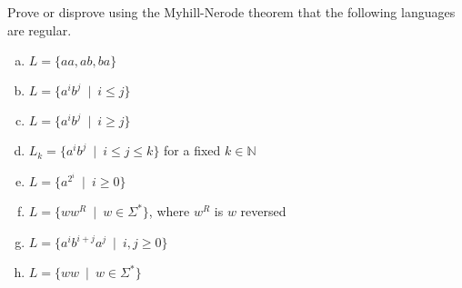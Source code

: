\documentclass[a4paper,12pt]{amsart}
\begin{document}
\medskip\begin{problem}

    Prove or disprove using the Myhill-Nerode theorem that the following languages are regular.
    \begin{enumerate}[(a)]\setlength\itemsep{12pt}
        \item $L=\{aa, ab, ba\}$
        \item $L=\{a^ib^j\ \mid\ i\leq j\}$
        \item $L=\{a^ib^j\ \mid\ i\geq j\}$
        \item $L_k=\{a^ib^j\ \mid\ i\leq j\leq k\}$ for a fixed $k\in\mathbb N$
        \item $L=\{a^{2^i}\ \mid\ i\geq 0\}$
        \item $L=\{ww^R\ \mid \ w\in\Sigma^*\}$, where $w^R$ is $w$ reversed

        \item $L=\{a^ib^{i+j}a^j\ \mid\ i,j\geq 0\}$
        \item $L=\{ww\ \mid \ w\in\Sigma^*\}$
    \end{enumerate}
    \end{problem}
\end{document}
